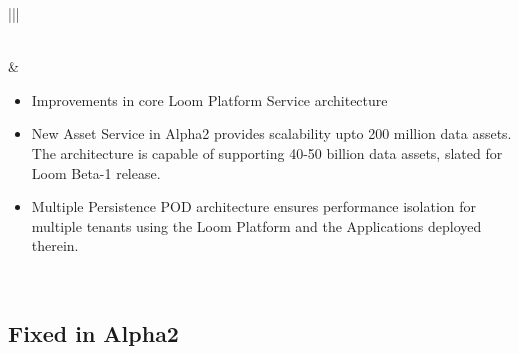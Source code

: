 \documentclass[letterpaper,10pt,english]{sphinxhowto}
\begin{document}
\begin{savenotes}
\begin{longtable}{|||}
\begin{itemize}
\end{itemize}
\\
\hline
{}
&
\begin{itemize}
\item {} 
Improvements in core Loom Platform Service architecture

\item {} 
New Asset Service in Alpha2 provides scalability upto 200 million data assets.
The architecture is capable of supporting 40-50 billion data assets, slated for
Loom Beta-1 release.

\item {} 
Multiple Persistence POD architecture ensures performance isolation for multiple
tenants using the Loom Platform and the Applications deployed therein.

\end{itemize}
\\
\hline
\end{longtable}\sphinxatlongtableend\end{savenotes}


\subsection{Fixed in Alpha2}
\label{\detokenize{relnotes/rn-loom-alpha2:fixed-in-alpha2}}
\end{document}
